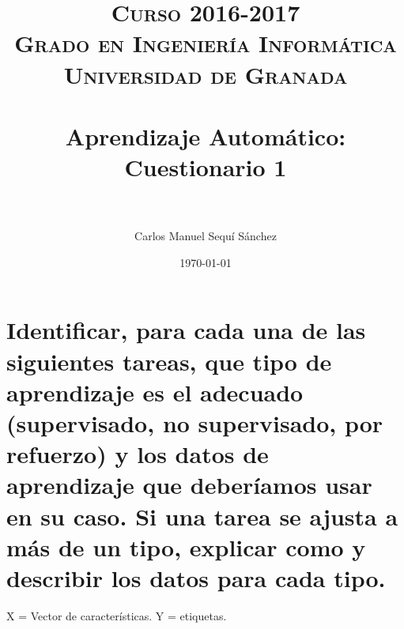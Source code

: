 


\title{	
\normalfont \normalsize 
\textsc{\textbf{Curso 2016-2017} \\ Grado en Ingeniería Informática \\ Universidad de Granada} \\ [25pt] %
\horrule{0.5pt} \\[0.4cm] %
\huge Aprendizaje Automático: Cuestionario 1 \\ %
\horrule{2pt} \\[0.5cm] %
}

\author{Carlos Manuel Sequí Sánchez} %

\date{\normalsize\today} %




\maketitle %

\newpage %

\tableofcontents %

\newpage

\section{ Identificar, para cada una de las siguientes tareas, que tipo de aprendizaje es el adecuado (supervisado, no supervisado, por refuerzo) y los datos de aprendizaje que deberíamos usar en su caso. Si una tarea se ajusta a más de un tipo, explicar como y describir los datos para cada tipo.}

X = Vector de características.
Y = etiquetas.

